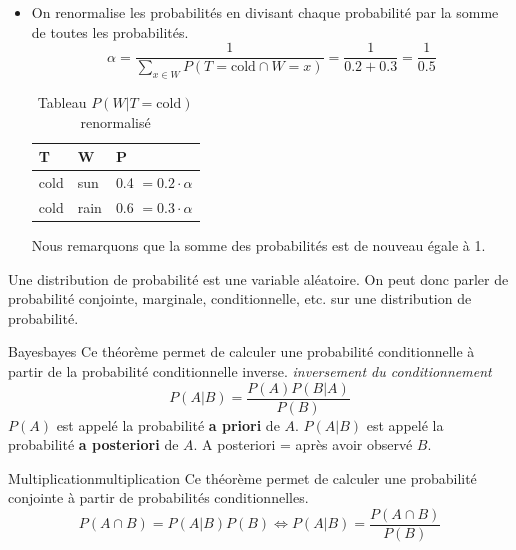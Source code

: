 \begin{example}
\begin{itemize}
        \item On renormalise les probabilités en divisant chaque probabilité par la somme de toutes les probabilités.
            \begin{equation*}
                \alpha = \frac{1}{\sum_{x \in W} P(T=\text{cold} \cap W=x)} = \frac{1}{0.2 + 0.3} = \frac{1}{0.5}
                \label{eq:renorm}
            \end{equation*}
            \begin{table}[H]
                \centering
                \begin{tabular}{|ll|l|}
                    \hline
                    \multicolumn{1}{|l|}{T} & W    & P   \\ \hline
                    cold                    & sun  & 0.4 $ = 0.2 \cdot \alpha$ \\
                    cold                    & rain & 0.6 $ = 0.3 \cdot \alpha$\\ \hline
                \end{tabular}
                \caption{Tableau $P(W | T=\text{cold})$ renormalisé}\label{fig:tableaucoldrenorm}
            \end{table}
            Nous remarquons que la somme des probabilités est de nouveau égale à 1.
    \end{itemize}
\end{example}


\begin{remark}
    Une distribution de probabilité est une variable aléatoire. 
    On peut donc parler de probabilité conjointe, marginale, conditionnelle, etc. 
    sur une distribution de probabilité. 
\end{remark}

\begin{theorem}{Bayes}{bayes}
    Ce théorème permet de calculer une probabilité conditionnelle à partir de la probabilité conditionnelle inverse. 
    \textit{inversement du conditionnement}
    \begin{equation}
        P(A|B) = \frac{P(A)P(B|A)}{P(B)}
    \end{equation}
    $P(A)$ est appelé la probabilité \textbf{a priori} de $A$. 
    $P(A|B)$ est appelé la probabilité \textbf{a posteriori} de $A$.
    A posteriori = après avoir observé $B$.
\end{theorem}

\begin{theorem}{Multiplication}{multiplication}
    Ce théorème permet de calculer une probabilité conjointe à partir de probabilités conditionnelles.
    \begin{equation}
        P(A\cap B) = P(A|B)P(B) \iff P(A|B) = \frac{P(A\cap B)}{P(B)}
    \end{equation} 
\end{theorem}


